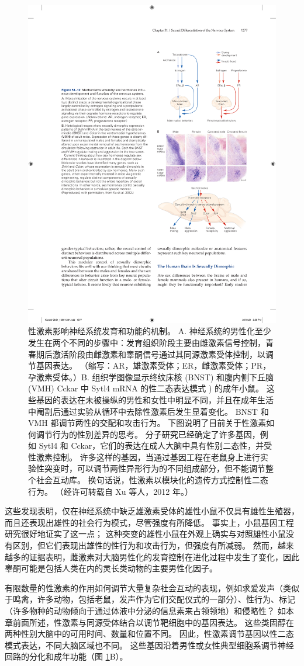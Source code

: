 \begin{figure}[htbp]
	\centering
	\includegraphics[width=0.55\linewidth]{chap51/fig_51_12}
	\caption{性激素影响神经系统发育和功能的机制。 A. 神经系统的男性化至少发生在两个不同的步骤中：发育组织阶段主要由雌激素信号控制，青春期后激活阶段由雌激素和睾酮信号通过其同源激素受体控制，以调节基因表达。 （缩写：AR，雄激素受体；ER，雌激素受体；PR，孕激素受体。）B. 组织学图像显示终纹床核 (BNST) 和腹内侧下丘脑 (VMH) Cckar 中 Sytl4 mRNA 的性二态表达模式 ) 的成年小鼠。 这些基因的表达在未被操纵的男性和女性中明显不同，并且在成年生活中阉割后通过实验从循环中去除性激素后发生显着变化。 BNST 和 VMH 都调节两性的交配和攻击行为。 下图说明了目前关于性激素如何调节行为的性别差异的思考。 分子研究已经确定了许多基因，例如 Sytl4 和 Cckar，它们的表达在成人大脑中具有性别二态性，并受性激素控制。 许多这样的基因，当通过基因工程在老鼠身上进行实验性突变时，可以调节两性异形行为的不同组成部分，但不能调节整个社会互动库。 换句话说，性激素以模块化的遗传方式控制性二态行为。 （经许可转载自 Xu 等人，2012 年。）}
	\label{fig:51_12}
\end{figure}

这些发现表明，仅在神经系统中缺乏雄激素受体的雄性小鼠不仅具有雄性生殖器，而且还表现出雄性的社会行为模式，尽管强度有所降低。 事实上，小鼠基因工程研究很好地证实了这一点； 这种突变的雄性小鼠在外观上确实与对照雄性小鼠没有区别，但它们表现出雄性的性行为和攻击行为，但强度有所减弱。 然而，越来越多的证据表明，雌激素对大脑男性化的发育控制在进化过程中发生了变化，因此睾酮可能是包括人类在内的灵长类动物的主要男性化因子。

有限数量的性激素的作用如何调节大量复杂社会互动的表现，例如求爱发声（类似于鸣禽，许多动物，包括老鼠，发声作为它们交配仪式的一部分）、性行为、标记 （许多物种的动物倾向于通过体液中分泌的信息素来占领领地）和侵略性？ 如本章前面所述，性激素与同源受体结合以调节靶细胞中的基因表达。 这些类固醇在两种性别大脑中的可用时间、数量和位置不同。 因此，性激素调节基因以性二态模式表达，不同大脑区域也不同。 这些基因沿着男性或女性典型细胞系调节神经回路的分化和成年功能（图 \ref{fig:51_12}B）。

